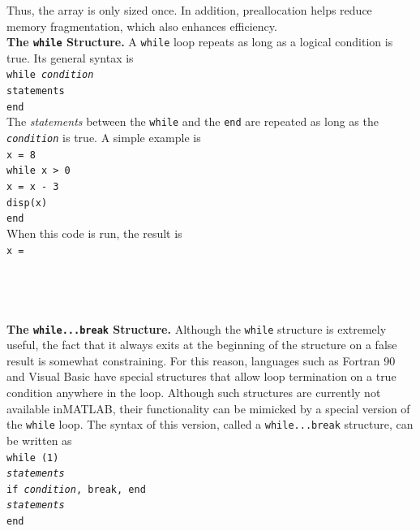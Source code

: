 \documentclass[../main.tex]{subfiles}
\begin{document}
\noindent Thus, the array is only sized once. In addition, preallocation helps reduce memory fragmentation,
which also enhances efficiency.\\

\noindent\textbf{The \texttt{while} Structure.} A \texttt{while} loop repeats as long as a logical condition is true. Its
general syntax is\\

\texttt{while \emph{condition}\\
\indent\hspace{2mm} statements\\
\indent end}\\

\noindent The \emph{statements} between the \texttt{while} and the \texttt{end} are repeated as long as the \texttt{\emph{condition}} is
true. A simple example is\\

\texttt{x = 8\\
\indent while x > 0\\
\indent\hspace{2mm} x = x - 3\\
\indent\hspace{2mm} disp(x)\\
\indent end}\\

\noindent When this code is run, the result is\\

\texttt{x =\\
\indent{}\\
\indent{}\\
\indent{}\\
\indent{}}\\

\noindent\textbf{The \texttt{while...break} Structure.} Although the \texttt{while} structure is extremely useful, the
fact that it always exits at the beginning of the structure on a false result is somewhat
constraining. For this reason, languages such as Fortran 90 and Visual Basic have special
structures that allow loop termination on a true condition anywhere in the loop. Although
such structures are currently not available inMATLAB, their functionality can be mimicked
by a special version of the \texttt{while} loop. The syntax of this version, called a \texttt{while...break} structure, can be written as\\

\texttt{while (1)\\
\indent\hspace{2mm} \emph{statements}\\
\indent\hspace{2mm} if \emph{condition}, break, end\\
\indent\hspace{2mm} \emph{statements}\\
\indent end}\\
\end{document}
